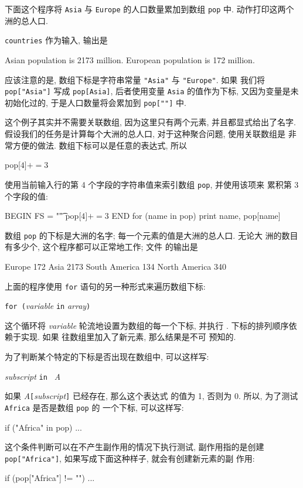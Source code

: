 下面这个程序将 \verb'Asia' 与 \verb'Europe' 的人口数量累加到数组 \verb'pop'
中. \END 动作打印这两个洲的总人口.
\verb'countries' 作为输入, 输出是
\begin{awkcode}
    Asian population is 2173 million.
    European population is 172 million.
\end{awkcode}
应该注意的是, 数组下标是字符串常量 \verb'"Asia"' 与 \verb'"Europe"'. 如果
我们将 \verb'pop["Asia"]' 写成 \verb'pop[Asia]', 后者使用变量 \verb'Asia'
的值作为下标, 又因为变量是未初始化过的, 于是人口数量将会累加到
\verb'pop[""]' 中.

这个例子其实并不需要关联数组, 因为这里只有两个元素, 并且都显式给出了名字.
假设我们的任务是计算每个大洲的总人口, 对于这种聚合问题, 使用关联数组是
非常方便的做法. 数组下标可以是任意的表达式, 所以
\begin{awkcode}
    pop[$4] += $3
\end{awkcode}
使用当前输入行的第 4 个字段的字符串值来索引数组 \verb'pop', 并使用该项来
累积第 3 个字段的值:
\begin{awkcode}
    BEGIN   { FS = "\t" }
            { pop[$4] += $3 }
    END     { for (name in pop)
                print name, pop[name]
            }
\end{awkcode}
数组 \verb'pop' 的下标是大洲的名字; 每一个元素的值是大洲的总人口. 无论大
洲的数目有多少个, 这个程序都可以正常地工作; 文件 
的输出是
\begin{awkcode}
    Europe 172
    Asia 2173
    South America 134
    North America 340
\end{awkcode}
上面的程序使用 \verb'for' 语句的另一种形式来遍历数组下标:
\begin{pattern}
    \verb'for ('\textit{variable} \verb'in' \textit{array}\verb')' \par
        \indent\indent\stmt
\end{pattern}
这个循环将 \textit{variable} 轮流地设置为数组的每一个下标, 并执行 \stmt.
下标的排列顺序依赖于实现. 如果 \stmt 往数组里加入了新元素, 那么结果是不可
预知的.

为了判断某个特定的下标是否出现在数组中, 可以这样写:
\begin{pattern}
    \textit{subscript} \verb'in ' \textit{A}
\end{pattern}
如果 \textit{A}\verb'['\textit{subscript}\verb']' 已经存在, 那么这个表达式
的值为 1, 否则为 0. 所以, 为了测试 \verb'Africa' 是否是数组 \verb'pop' 的
一个下标, 可以这样写:
\begin{awkcode}
    if ("Africa" in pop) ...
\end{awkcode}
这个条件判断可以在不产生副作用的情况下执行测试, 副作用指的是创建
\verb'pop["Africa"]', 如果写成下面这种样子, 就会有创建新元素的副
作用:
\begin{awkcode}
    if (pop["Africa"] != "") ...
\end{awkcode}


